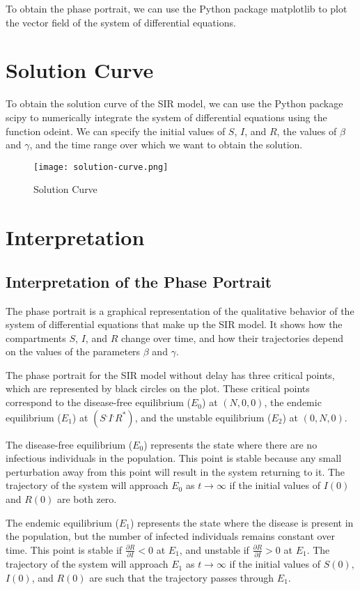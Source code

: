 \documentclass{article}
\begin{document}
To obtain the phase portrait, we can use the Python package matplotlib to plot the vector field of the system of differential equations.
\section{Solution Curve}
To obtain the solution curve of the SIR model, we can use the Python package scipy to numerically integrate the system of differential equations using the function odeint. We can specify the initial values of $S$, $I$, and $R$, the values of $\beta$ and $\gamma$, and the time range over which we want to obtain the solution.
\begin{figure}[htbp]
\centering
\texttt{[image: solution-curve.png]}
\caption{Solution Curve}
\label{fig:architecture}
\end{figure}

\section{Interpretation}
\subsection*{Interpretation of the Phase Portrait}

The phase portrait is a graphical representation of the qualitative behavior of the system of differential equations that make up the SIR model. It shows how the compartments $S$, $I$, and $R$ change over time, and how their trajectories depend on the values of the parameters $\beta$ and $\gamma$.

The phase portrait for the SIR model without delay has three critical points, which are represented by black circles on the plot. These critical points correspond to the disease-free equilibrium ($E_0$) at $(N,0,0)$, the endemic equilibrium ($E_1$) at $(S^,I^,R^*)$, and the unstable equilibrium ($E_2$) at $(0,N,0)$.

The disease-free equilibrium ($E_0$) represents the state where there are no infectious individuals in the population. This point is stable because any small perturbation away from this point will result in the system returning to it. The trajectory of the system will approach $E_0$ as $t \to \infty$ if the initial values of $I(0)$ and $R(0)$ are both zero.

The endemic equilibrium ($E_1$) represents the state where the disease is present in the population, but the number of infected individuals remains constant over time. This point is stable if $\frac{\partial R}{\partial I} < 0$ at $E_1$, and unstable if $\frac{\partial R}{\partial I} > 0$ at $E_1$. The trajectory of the system will approach $E_1$ as $t \to \infty$ if the initial values of $S(0)$, $I(0)$, and $R(0)$ are such that the trajectory passes through $E_1$.
\end{document}
